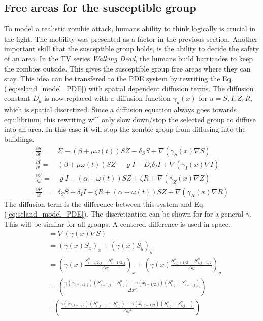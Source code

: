 \documentclass[%
twoside,                 %
final,                   %
chapterprefix=true,      %
open=right               %
10pt]{book}
\begin{document}
\noindent





\subsection{Free areas for the susceptible group}
To model a realistic zombie attack, humans ability to think logically is crucial in the fight. The mobility was presented as a factor in the previous section. Another important skill that the susceptible group holds, is the ability to decide the safety of an area. In the TV series \emph{Walking Dead}, the humans build barricades to keep the zombies outside. This gives the susceptible group free areas where they can stay. This idea can be transfered to the PDE system by rewriting the Eq.(\ref{eq:seland_model_PDE}) with spatial dependent diffusion terms. The diffusion constant $D_u$ is now replaced with a diffusion function $\gamma_u(x)$ for $u= S,I,Z,R$, which is spatial discretized. Since a diffusion equation always goes towards equilibrium, this rewriting will only slow down/stop the selected group to diffuse into an area. In this case it will stop the zombie group from diffusing into the buildings. 
\begin{equation} \label{eq:seland_model_diff}
    \begin{aligned} 
    \frac{\partial S}{\partial t} =& \Sigma -(\beta+\mu \omega(t))SZ - \delta_SS +\nabla(\gamma_S(x) \nabla S) \\
    \frac{\partial I}{\partial t} =& (\beta+\mu \omega(t))SZ - \varrho I - D_i\delta_II+\nabla(\gamma_I(x) \nabla I)\\
    \frac{\partial Z}{\partial t} =& \varrho I- (\alpha+\omega(t))SZ + \zeta R+\nabla(\gamma_Z(x) \nabla Z)\\
    \frac{\partial R}{\partial t} =& \delta_SS +\delta_II -\zeta R + (\alpha+\omega(t))SZ+\nabla(\gamma_R(x) \nabla R) 
    \end{aligned}
\end{equation}
The diffusion term is the difference between this system and Eq.(\ref{eq:seland_model_PDE}). The discretization can be shown for for a general $\gamma$. This will be similar for all groups. A centered difference is used in space.
\begin{equation} \label{eq:gamma}
    \begin{aligned}
    &=\nabla(\gamma(x) \nabla S) \\
    &=(\gamma(x) S_x)_x+(\gamma(x) S_y)_y \\
    &= \left(\gamma(x) \frac{S^{n}_{i+1/2,j}-S^{n}_{i-1/2,j}}{\Delta x}\right)_x+\left(\gamma(x) \frac{S^{n}_{i,j+1/2}-S^{n}_{i,j-1/2}}{\Delta y}\right)_y \\
    &= \left(\frac{\gamma(x_{i+1/2,j})(S^{n}_{i+1,j}-S^{n}_{i,j})-\gamma(x_{i-1/2,j})(S^{n}_{i,j}-S^{n}_{i-1,j})}{\Delta x^2}\right) \\
    &+ \left(\frac{\gamma(x_{i,j+1/2})(S^{n}_{i,j+1}-S^{n}_{i,j})-\gamma(x_{i,j-1/2})(S^{n}_{i,j}-S^{n}_{i,j-})}{\Delta y^2}\right)
    \end{aligned}
\end{equation}
\end{document}
